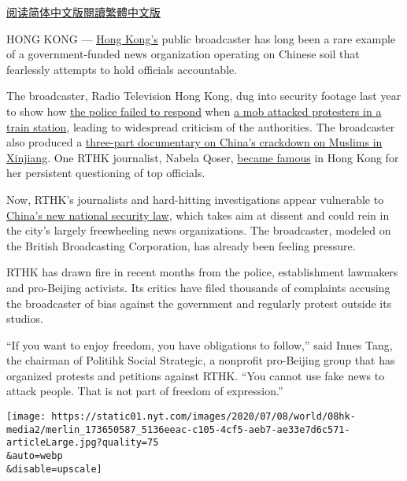 \href{https://cn.nytimes.com/china/20200709/hong-kong-security-china-media/}{阅读简体中文版}\href{https://cn.nytimes.com/china/20200709/hong-kong-security-china-media/zh-hant/}{閱讀繁體中文版}

HONG KONG ---
\href{https://www.nytimes.com/2020/07/13/world/asia/hong-kong-elections-security.html}{Hong
Kong's} public broadcaster has long been a rare example of a
government-funded news organization operating on Chinese soil that
fearlessly attempts to hold officials accountable.

The broadcaster, Radio Television Hong Kong, dug into security footage
last year to show how
\href{https://tvfilm.newyorkfestivals.com/Winners/WinnerDetailsNew/ae1a0cfa-80bf-4449-bddf-47ddee103758}{the
police failed to respond} when
\href{https://www.nytimes.com/2019/07/22/world/asia/hong-kong-protest-mob-attack-yuen-long.html}{a
mob attacked protesters in a train station}, leading to widespread
criticism of the authorities. The broadcaster also produced a
\href{https://tvfilm.newyorkfestivals.com/Winners/WinnerDetailsNew/e8b03ef2-7a8a-422f-b42c-cc44f802f7f6}{three-part
documentary on China's crackdown on Muslims in Xinjiang}. One RTHK
journalist, Nabela Qoser,
\href{https://twitter.com/tomgrundy/status/1153515102043197442}{became
famous} in Hong Kong for her persistent questioning of top officials.

Now, RTHK's journalists and hard-hitting investigations appear
vulnerable to
\href{https://www.nytimes.com/2020/07/13/world/asia/hong-kong-elections-security.html}{China's
new national security law}, which takes aim at dissent and could rein in
the city's largely freewheeling news organizations. The broadcaster,
modeled on the British Broadcasting Corporation, has already been
feeling pressure.

RTHK has drawn fire in recent months from the police, establishment
lawmakers and pro-Beijing activists. Its critics have filed thousands of
complaints accusing the broadcaster of bias against the government and
regularly protest outside its studios.

``If you want to enjoy freedom, you have obligations to follow,'' said
Innes Tang, the chairman of Politihk Social Strategic, a nonprofit
pro-Beijing group that has organized protests and petitions against
RTHK. ``You cannot use fake news to attack people. That is not part of
freedom of expression.''

\texttt{[image: https://static01.nyt.com/images/2020/07/08/world/08hk-media2/merlin\_173650587\_5136eeac-c105-4cf5-aeb7-ae33e7d6c571-articleLarge.jpg?quality=75\\\&auto=webp\\\&disable=upscale]}

